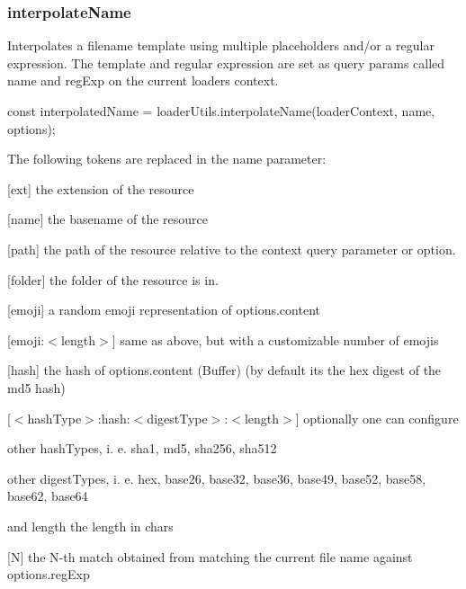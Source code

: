 \subsubsection*{{\ttfamily interpolate\+Name}}

Interpolates a filename template using multiple placeholders and/or a regular expression. The template and regular expression are set as query params called {\ttfamily name} and {\ttfamily reg\+Exp} on the current loader\textquotesingle{}s context.


\begin{DoxyCode}
const interpolatedName = loaderUtils.interpolateName(loaderContext, name, options);
\end{DoxyCode}


The following tokens are replaced in the {\ttfamily name} parameter\+:


\begin{DoxyItemize}
\item {\ttfamily \mbox{[}ext\mbox{]}} the extension of the resource
\item {\ttfamily \mbox{[}name\mbox{]}} the basename of the resource
\item {\ttfamily \mbox{[}path\mbox{]}} the path of the resource relative to the {\ttfamily context} query parameter or option.
\item {\ttfamily \mbox{[}folder\mbox{]}} the folder of the resource is in.
\item {\ttfamily \mbox{[}emoji\mbox{]}} a random emoji representation of {\ttfamily options.\+content}
\item {\ttfamily \mbox{[}emoji\+:$<$length$>$\mbox{]}} same as above, but with a customizable number of emojis
\item {\ttfamily \mbox{[}hash\mbox{]}} the hash of {\ttfamily options.\+content} (Buffer) (by default it\textquotesingle{}s the hex digest of the md5 hash)
\item {\ttfamily \mbox{[}$<$hash\+Type$>$\+:hash\+:$<$digest\+Type$>$\+:$<$length$>$\mbox{]}} optionally one can configure
\begin{DoxyItemize}
\item other {\ttfamily hash\+Type}s, i. e. {\ttfamily sha1}, {\ttfamily md5}, {\ttfamily sha256}, {\ttfamily sha512}
\item other {\ttfamily digest\+Type}s, i. e. {\ttfamily hex}, {\ttfamily base26}, {\ttfamily base32}, {\ttfamily base36}, {\ttfamily base49}, {\ttfamily base52}, {\ttfamily base58}, {\ttfamily base62}, {\ttfamily base64}
\item and {\ttfamily length} the length in chars
\end{DoxyItemize}
\item {\ttfamily \mbox{[}N\mbox{]}} the N-\/th match obtained from matching the current file name against {\ttfamily options.\+reg\+Exp}
\end{DoxyItemize}

